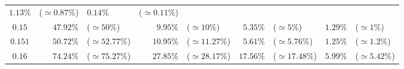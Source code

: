 \documentclass[10pt]{report}
\begin{document}
\begin{exercice}
\begin{center}
\begin{tabular}{|c|rl|rl|rl|rl|}
        $1.13\%$
         & 
    
        ($\simeq0.87\%$)
         & 
    
        $0.14\%$
         & 
    
        ($\simeq0.11\%$)
        
    \\ 

    
        $0.15$
         & 
    
        $47.92\%$
         & 
    
        ($\simeq50\%$)
         & 
    
        $9.95\%$
         & 
    
        ($\simeq10\%$)
         & 
    
        $5.35\%$
         & 
    
        ($\simeq5\%$)
         & 
    
        $1.29\%$
         & 
    
        ($\simeq1\%$)
        
    \\ 

    
        $0.151$
         & 
    
        $50.72\%$
         & 
    
        ($\simeq52.77\%$)
         & 
    
        $10.95\%$
         & 
    
        ($\simeq11.27\%$)
         & 
    
        $5.61\%$
         & 
    
        ($\simeq5.76\%$)
         & 
    
        $1.25\%$
         & 
    
        ($\simeq1.2\%$)
        
    \\ 

    
        $0.16$
         & 
    
        $74.24\%$
         & 
    
        ($\simeq75.27\%$)
         & 
    
        $27.85\%$
         & 
    
        ($\simeq28.17\%$)
         & 
    
        $17.56\%$
         & 
    
        ($\simeq17.48\%$)
         & 
    
        $5.99\%$
         & 
    
        ($\simeq5.42\%$)
        

\end{tabular}
\end{center}
\end{exercice}
\end{document}

